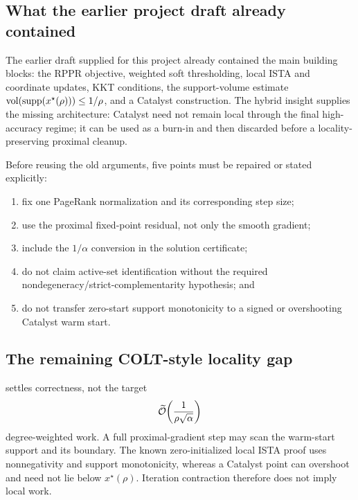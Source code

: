 \subsection{What the earlier project draft already contained}

The earlier draft supplied for this project already contained the main
building blocks: the RPPR objective, weighted soft thresholding, local ISTA
and coordinate updates, KKT conditions, the support-volume estimate
$\operatorname{vol}(\operatorname{supp}(x^\star(\rho)))\leq1/\rho$, and a Catalyst construction.  The
hybrid insight supplies the missing architecture: Catalyst need not remain
local through the final high-accuracy regime; it can be used as a burn-in and
then discarded before a locality-preserving proximal cleanup.

Before reusing the old arguments, five points must be repaired or stated
explicitly:
\begin{enumerate}[leftmargin=2em]
  \item fix one PageRank normalization and its corresponding step size;
  \item use the proximal fixed-point residual, not only the smooth gradient;
  \item include the $1/\alpha$ conversion in the solution certificate;
  \item do not claim active-set identification without the required
        nondegeneracy/strict-complementarity hypothesis; and
  \item do not transfer zero-start support monotonicity to a signed or
        overshooting Catalyst warm start.
\end{enumerate}

\subsection{The remaining COLT-style locality gap}

 settles correctness, not the target
\begin{equation}
  \widetilde{\mathcal O}\!\left(\frac1{\rho\sqrt\alpha}\right)
  \label{eq:rppr-target-work}
\end{equation}
degree-weighted work.  A full proximal-gradient step may scan the warm-start
support and its boundary.  The known zero-initialized local ISTA proof uses
nonnegativity and support monotonicity, whereas a Catalyst point can overshoot
and need not lie below $x^\star(\rho)$.  Iteration contraction therefore does
not imply local work.

